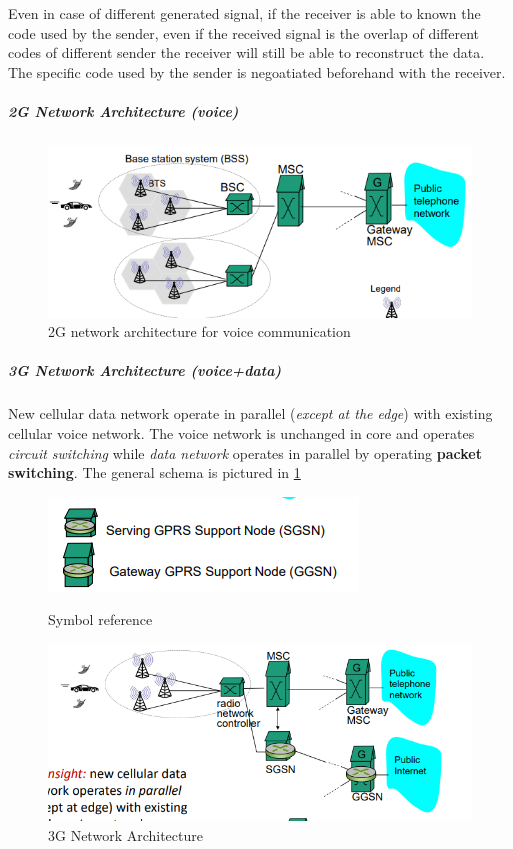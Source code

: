 \documentclass[10pt,a4paper]{report}
\theoremstyle{definition}
\begin{document}
Even in case of different generated signal, if the receiver is able to known the code used by the sender, even if the received signal is the overlap of different codes of different sender the receiver will still be able to reconstruct the data. The specific code used by the sender is negoatiated beforehand with the receiver.
\subparagraph{2G Network Architecture (voice)}\label{sec:2g-network-architecture-voice}
\begin{figure}[h]
	\centering\includegraphics[scale=0.60]{images/Pasted image 20230301174502.png}
	\caption{2G network architecture for voice communication}

\end{figure}


\subparagraph{3G Network Architecture (voice+data)}\label{sec:3g-network-architecture-voicedata}
New cellular data network operate in parallel (\textit{except at the edge}) with existing cellular voice network. The voice network is unchanged in core and operates \textit{circuit switching} while \textit{data network} operates in parallel by operating \textbf{packet switching}. The general schema is pictured in \ref{3g-schema}



\begin{figure}[ht]
	\begin{minipage}[b]{0.45\linewidth}
		\centering
		\includegraphics[scale=0.40]{images/Pasted image 20230301174908.png}
		\caption{Symbol reference}
		\label{fig:a}
	\end{minipage}
	\hspace{0.5cm}
	\begin{minipage}[b]{0.45\linewidth}
		\centering
		\includegraphics[scale=0.40]{images/Pasted image 20230301174843.png}
		\caption{3G Network Architecture}
		\label{3g-schema}
	\end{minipage}
\end{figure}
\end{document}
